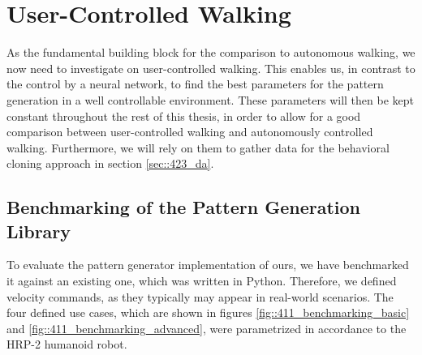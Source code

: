 \FloatBarrier
\section{User-Controlled Walking}
\label{sec::41_uc}
As the fundamental building block for the comparison to autonomous walking, we now need to investigate on user-controlled walking. This enables us, in contrast to the control by a neural network, to find the best parameters for the pattern generation in a well controllable environment. These parameters will then be kept constant throughout the rest of this thesis, in order to allow for a good comparison between user-controlled walking and autonomously controlled walking. Furthermore, we will rely on them to gather data for the behavioral cloning approach in section \ref{sec::423_da}.
\FloatBarrier
\subsection{Benchmarking of the Pattern Generation Library}
\label{sec::411_bm}
To evaluate the pattern generator implementation of ours, we have benchmarked it against an existing one, which was written in Python. Therefore, we defined velocity commands, as they typically may appear in real-world scenarios. The four defined use cases, which are shown in figures \ref{fig::411_benchmarking_basic} and \ref{fig::411_benchmarking_advanced}, were parametrized in accordance to the HRP-2 humanoid robot.
